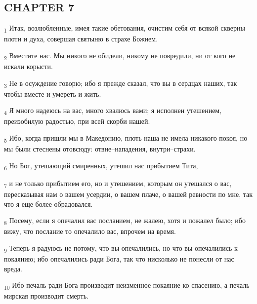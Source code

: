 \subsection{CHAPTER 7}
\begin{tcolorbox}
\textsubscript{1} Итак, возлюбленные, имея такие обетования, очистим себя от всякой скверны плоти и духа, совершая святыню в страхе Божием.
\end{tcolorbox}
\begin{tcolorbox}
\textsubscript{2} Вместите нас. Мы никого не обидели, никому не повредили, ни от кого не искали корысти.
\end{tcolorbox}
\begin{tcolorbox}
\textsubscript{3} Не в осуждение говорю; ибо я прежде сказал, что вы в сердцах наших, так чтобы вместе и умереть и жить.
\end{tcolorbox}
\begin{tcolorbox}
\textsubscript{4} Я много надеюсь на вас, много хвалюсь вами; я исполнен утешением, преизобилую радостью, при всей скорби нашей.
\end{tcolorbox}
\begin{tcolorbox}
\textsubscript{5} Ибо, когда пришли мы в Македонию, плоть наша не имела никакого покоя, но мы были стеснены отовсюду: отвне--нападения, внутри--страхи.
\end{tcolorbox}
\begin{tcolorbox}
\textsubscript{6} Но Бог, утешающий смиренных, утешил нас прибытием Тита,
\end{tcolorbox}
\begin{tcolorbox}
\textsubscript{7} и не только прибытием его, но и утешением, которым он утешался о вас, пересказывая нам о вашем усердии, о вашем плаче, о вашей ревности по мне, так что я еще более обрадовался.
\end{tcolorbox}
\begin{tcolorbox}
\textsubscript{8} Посему, если я опечалил вас посланием, не жалею, хотя и пожалел было; ибо вижу, что послание то опечалило вас, впрочем на время.
\end{tcolorbox}
\begin{tcolorbox}
\textsubscript{9} Теперь я радуюсь не потому, что вы опечалились, но что вы опечалились к покаянию; ибо опечалились ради Бога, так что нисколько не понесли от нас вреда.
\end{tcolorbox}
\begin{tcolorbox}
\textsubscript{10} Ибо печаль ради Бога производит неизменное покаяние ко спасению, а печаль мирская производит смерть.
\end{tcolorbox}
